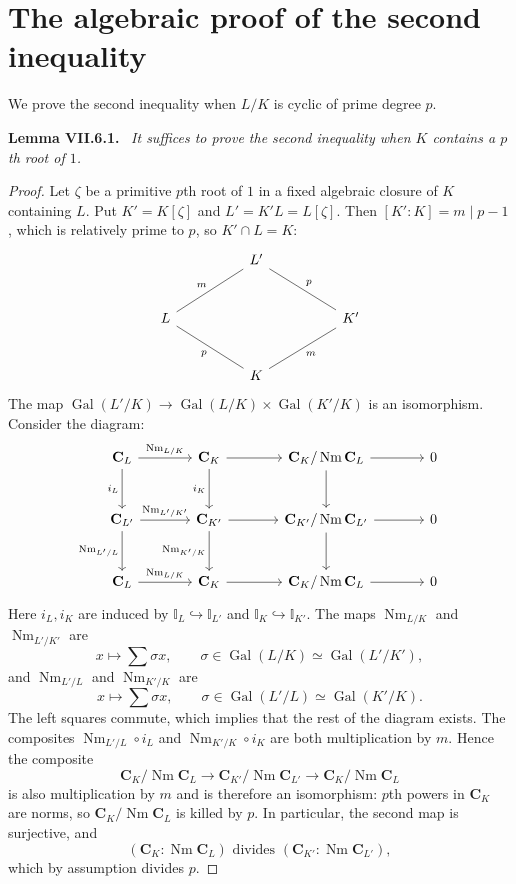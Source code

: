 \documentclass[11pt]{article}
\newcommand{\I}{\mathbb I}
\newcommand{\C}{\mathbf C}
\newcommand{\Nm}{\operatorname{Nm}}
\newcommand{\Gal}{\operatorname{Gal}}
\newenvironment{authorresult}[2]{\par\medskip\noindent\textbf{#1 VII.#2.}\ \itshape}{\par\medskip}
\begin{document}
\section*{The algebraic proof of the second inequality}
We prove the second inequality when $L/K$ is cyclic of prime degree $p$.
\begin{authorresult}{Lemma}{6.1}
It suffices to prove the second inequality when $K$ contains a $p$th root of $1$.
\end{authorresult}
\begin{proof}
Let $\zeta$ be a primitive $p$th root of $1$ in a fixed algebraic closure of
$K$ containing $L$. Put $K'=K[\zeta]$ and $L'=K'L=L[\zeta]$.
Then $[K':K]=m\mid p-1$, which is relatively prime to $p$, so $K'\cap L=K$:
\[
\begin{tikzcd}[row sep=large,column sep=huge]
 & L'\arrow[dl,dash,"m"']\arrow[dr,dash,"p"] & \\
 L\arrow[dr,dash,"p"'] && K'\arrow[dl,dash,"m"] \\
 & K &
\end{tikzcd}
\]
The map $\Gal(L'/K)\longrightarrow\Gal(L/K)\times\Gal(K'/K)$ is an
isomorphism. Consider the diagram:
\[
\begin{tikzcd}[column sep=large,row sep=large]
\C_L\arrow[r,"\Nm_{L/K}"]\arrow[d,"i_L"']&
\C_K\arrow[r]\arrow[d,"i_K"']&\C_K/\Nm\C_L\arrow[r]\arrow[d]&0\\
\C_{L'}\arrow[r,"\Nm_{L'/K'}"]\arrow[d,"\Nm_{L'/L}"']&
\C_{K'}\arrow[r]\arrow[d,"\Nm_{K'/K}"']&\C_{K'}/\Nm\C_{L'}\arrow[r]\arrow[d]&0\\
\C_L\arrow[r,"\Nm_{L/K}"]&\C_K\arrow[r]&\C_K/\Nm\C_L\arrow[r]&0
\end{tikzcd}
\]
Here $i_L,i_K$ are induced by $\I_L\hookrightarrow\I_{L'}$ and
$\I_K\hookrightarrow\I_{K'}$. The maps $\Nm_{L/K}$ and $\Nm_{L'/K'}$ are
\[
 x\longmapsto\sum\sigma x,
 \qquad\sigma\in\Gal(L/K)\simeq\Gal(L'/K'),
\]
and $\Nm_{L'/L}$ and $\Nm_{K'/K}$ are
\[
 x\longmapsto\sum\sigma x,
 \qquad\sigma\in\Gal(L'/L)\simeq\Gal(K'/K).
\]
The left squares commute, which implies that the rest of the diagram exists.
The composites $\Nm_{L'/L}\circ i_L$ and $\Nm_{K'/K}\circ i_K$ are both
multiplication by $m$. Hence the composite
\[
 \C_K/\Nm\C_L\longrightarrow\C_{K'}/\Nm\C_{L'}
 \longrightarrow\C_K/\Nm\C_L
\]
is also multiplication by $m$ and is therefore an isomorphism: $p$th powers
in $\C_K$ are norms, so $\C_K/\Nm\C_L$ is killed by $p$.
In particular, the second map is surjective, and
\[
 (\C_K:\Nm\C_L)\text{ divides }(\C_{K'}:\Nm\C_{L'}),
\]
which by assumption divides $p$.
\end{proof}
\end{document}
